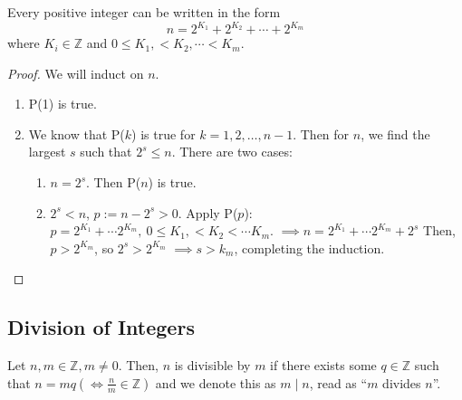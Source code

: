 \documentclass{article}
\newcommand{\Z}{\mathbb{Z}}
\newcommand{\proposition}[1]{\begin{tcolorbox}[title=Proposition]{#1}\end{tcolorbox}}
\begin{document}
\proposition{
    Every positive integer can be written in the form 
    \[n = 2^{K_1} + 2^{K_2} + \cdots + 2^{K_m}\]
    where $K_i \in \Z$ and $0 \leq K_1, < K_2, \cdots < K_m$.
}
\begin{proof}
    We will induct on $n$.
    \begin{enumerate}[label=\textit{(\roman*)}]
        \item P(1) is true.
        \item We know that P($k$) is true for $k = 1, 2, \ldots, n - 1$. Then for $n$, we find
            the largest $s$ such that $2^s \leq n$. There are two cases:
\begin{enumerate}[label=\textit{(\roman*)}]
    \item $n = 2^s$. Then P($n$) is true.
    \item $2^s < n$, $p := n - 2^s > 0$. 
        \newline
        Apply P($p$): $p = 2^{K_1} + \cdots 2^{K_m}, \ 0 \leq K_1, < K_2 < \cdots K_m$.
        \newline
        $\implies n = 2^{K_1} + \cdots 2^{K_m} + 2^s$ Then, $p > 2^{K_m}$, so $2^s > 2^{K_m}$
        \newline
        $\implies s > k_m$, completing the induction.
\end{enumerate}
    \end{enumerate}
\end{proof}

\subsection{Division of Integers}
Let $n, m \in \Z, m \neq 0$. Then, $n$ is divisible by $m$ if there exists some $q \in \Z$ such that
$n = mq (\iff \frac{n}{m} \in \Z)$ and we denote this as $m \mid n$, read as ``$m$ divides $n$''.
\end{document}
